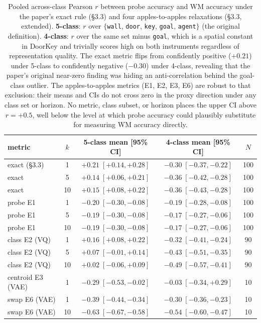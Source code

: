 \begin{table}[ht]
\centering
\small
\begin{tabular}{l c c c c}
\hline
metric & $k$ & 5-class mean [95\% CI] & 4-class mean [95\% CI] & $N$ \\
\hline
exact (\S3.3)                & 1  & $+0.21\;[+0.14,+0.28]$ & $\mathbf{-0.30\;[-0.37,-0.22]}$ & 100 \\
exact                        & 5  & $+0.14\;[+0.06,+0.21]$ & $-0.36\;[-0.42,-0.28]$           & 100 \\
exact                        & 10 & $+0.15\;[+0.08,+0.22]$ & $-0.36\;[-0.43,-0.28]$           & 100 \\
\hline
probe E1                     & 1  & $-0.20\;[-0.30,-0.08]$ & $-0.19\;[-0.28,-0.08]$           & 100 \\
probe E1                     & 5  & $-0.19\;[-0.30,-0.08]$ & $-0.17\;[-0.27,-0.06]$           & 100 \\
probe E1                     & 10 & $-0.19\;[-0.30,-0.08]$ & $-0.17\;[-0.27,-0.06]$           & 100 \\
\hline
class E2 (VQ)                & 1  & $+0.16\;[+0.08,+0.22]$ & $\mathbf{-0.32\;[-0.41,-0.24]}$  & 90 \\
class E2 (VQ)                & 5  & $+0.07\;[-0.01,+0.14]$ & $-0.43\;[-0.51,-0.35]$           & 90 \\
class E2 (VQ)                & 10 & $+0.02\;[-0.06,+0.09]$ & $-0.49\;[-0.57,-0.41]$           & 90 \\
\hline
centroid E3 (VAE)            & 1  & $-0.29\;[-0.53,-0.02]$ & $-0.03\;[-0.34,+0.29]$           & 10 \\
swap E6 (VAE)                & 1  & $\mathbf{-0.39\;[-0.44,-0.34]}$ & $-0.30\;[-0.36,-0.23]$  & 10 \\
swap E6 (VAE)                & 10 & $-0.63\;[-0.67,-0.58]$ & $-0.54\;[-0.60,-0.47]$           & 10 \\
\hline
\end{tabular}
\caption{Pooled across-class Pearson $r$ between probe accuracy and WM accuracy under the paper's exact rule (\S3.3) and four apples-to-apples relaxations (\S3.3, extended). \textbf{5-class}: $r$ over $\{$\texttt{wall}, \texttt{door}, \texttt{key}, \texttt{goal}, \texttt{agent}$\}$ (the original definition). \textbf{4-class}: $r$ over the same set minus \texttt{goal}, which is a spatial constant in DoorKey and trivially scores high on both instruments regardless of representation quality. The exact metric flips from confidently positive ($+0.21$) under 5-class to confidently negative ($-0.30$) under 4-class, revealing that the paper's original near-zero finding was hiding an anti-correlation behind the goal-class outlier. The apples-to-apples metrics (E1, E2, E3, E6) are robust to that exclusion: their means and CIs do not cross zero in the proxy direction under any class set or horizon. No metric, class subset, or horizon places the upper CI above $r{=}+0.5$, well below the level at which probe accuracy could plausibly substitute for measuring WM accuracy directly.}
\label{tab:pearson-extended}
\end{table}
